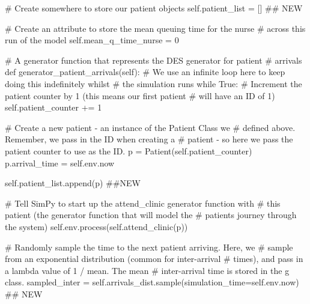 \documentclass[
  letterpaper,
  DIV=11,
  numbers=noendperiod]{scrreprt}
\newenvironment{Shaded}{\begin{snugshade}}{\end{snugshade}}
\newcommand{\CommentTok}[1]{\textcolor[rgb]{0.37,0.37,0.37}{#1}}
\newcommand{\ControlFlowTok}[1]{\textcolor[rgb]{0.00,0.23,0.31}{#1}}
\newcommand{\DecValTok}[1]{\textcolor[rgb]{0.68,0.00,0.00}{#1}}
\newcommand{\KeywordTok}[1]{\textcolor[rgb]{0.00,0.23,0.31}{#1}}
\newcommand{\NormalTok}[1]{\textcolor[rgb]{0.00,0.23,0.31}{#1}}
\newcommand{\OperatorTok}[1]{\textcolor[rgb]{0.37,0.37,0.37}{#1}}
\newcommand{\VariableTok}[1]{\textcolor[rgb]{0.07,0.07,0.07}{#1}}
\begin{document}
\begin{tcolorbox}
\begin{Shaded}
\begin{Highlighting}[]
        \CommentTok{\# Create somewhere to store our patient objects}
        \VariableTok{self}\NormalTok{.patient\_list }\OperatorTok{=}\NormalTok{ [] }\CommentTok{\#\# NEW}

        \CommentTok{\# Create an attribute to store the mean queuing time for the nurse}
        \CommentTok{\# across this run of the model}
        \VariableTok{self}\NormalTok{.mean\_q\_time\_nurse }\OperatorTok{=} \DecValTok{0}

    \CommentTok{\# A generator function that represents the DES generator for patient}
    \CommentTok{\# arrivals}
    \KeywordTok{def}\NormalTok{ generator\_patient\_arrivals(}\VariableTok{self}\NormalTok{):}
        \CommentTok{\# We use an infinite loop here to keep doing this indefinitely whilst}
        \CommentTok{\# the simulation runs}
        \ControlFlowTok{while} \VariableTok{True}\NormalTok{:}
            \CommentTok{\# Increment the patient counter by 1 (this means our first patient}
            \CommentTok{\# will have an ID of 1)}
            \VariableTok{self}\NormalTok{.patient\_counter }\OperatorTok{+=} \DecValTok{1}

            \CommentTok{\# Create a new patient {-} an instance of the Patient Class we}
            \CommentTok{\# defined above.  Remember, we pass in the ID when creating a}
            \CommentTok{\# patient {-} so here we pass the patient counter to use as the ID.}
\NormalTok{            p }\OperatorTok{=}\NormalTok{ Patient(}\VariableTok{self}\NormalTok{.patient\_counter)}
\NormalTok{            p.arrival\_time }\OperatorTok{=} \VariableTok{self}\NormalTok{.env.now}

            \VariableTok{self}\NormalTok{.patient\_list.append(p) }\CommentTok{\#\#NEW}

            \CommentTok{\# Tell SimPy to start up the attend\_clinic generator function with}
            \CommentTok{\# this patient (the generator function that will model the}
            \CommentTok{\# patient\textquotesingle{}s journey through the system)}
            \VariableTok{self}\NormalTok{.env.process(}\VariableTok{self}\NormalTok{.attend\_clinic(p))}

            \CommentTok{\# Randomly sample the time to the next patient arriving.  Here, we}
            \CommentTok{\# sample from an exponential distribution (common for inter{-}arrival}
            \CommentTok{\# times), and pass in a lambda value of 1 / mean.  The mean}
            \CommentTok{\# inter{-}arrival time is stored in the g class.}
\NormalTok{            sampled\_inter }\OperatorTok{=} \VariableTok{self}\NormalTok{.arrivals\_dist.sample(simulation\_time}\OperatorTok{=}\VariableTok{self}\NormalTok{.env.now) }\CommentTok{\#\# NEW}


\end{Highlighting}
\end{Shaded}
\end{tcolorbox}
\end{document}
